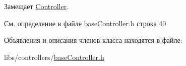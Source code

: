 Замещает \hyperlink{class_controller_a4cc69a630011f49efb0c221d617af633}{Controller}.



См. определение в файле base\-Controller.\-h строка 40



Объявления и описания членов класса находятся в файле\-:\begin{DoxyCompactItemize}
\item 
libs/controllers/\hyperlink{base_controller_8h}{base\-Controller.\-h}\end{DoxyCompactItemize}

